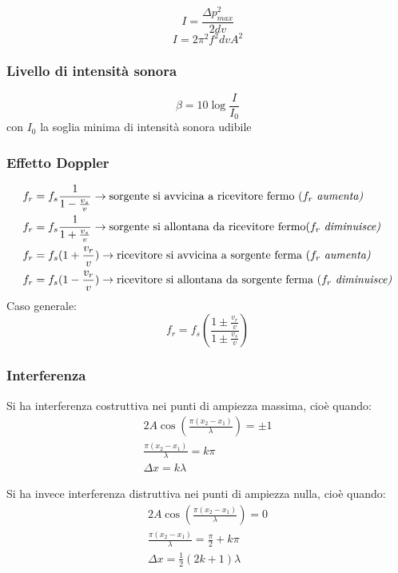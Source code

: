\documentclass{article}
\begin{document}
\vspace{1em}

$$ I = \frac{\Delta p_{max}^2}{2dv} $$
$$ I = 2\pi^2 f^2 dvA^2 $$

\subsubsection*{Livello di intensità sonora}
$$ \beta = 10 \log\frac{I}{I_0} $$
con $I_0$ la soglia minima di intensità sonora udibile

\subsubsection*{Effetto Doppler}
\begin{align*}
    f_r &= f_s \frac{1}{1 - \frac{v_s}{v}} \rightarrow \text{sorgente si avvicina a ricevitore fermo ($f_r$ \textit{aumenta)}} \\
    f_r &= f_s \frac{1}{1 + \frac{v_s}{v}} \rightarrow \text{sorgente si allontana da ricevitore fermo($f_r$ \textit{diminuisce)}} \\
    f_r &= f_s(1 + \frac{v_r}{v}) \rightarrow \text{ricevitore si avvicina a sorgente ferma ($f_r$ \textit{aumenta)}} \\
    f_r &= f_s(1 - \frac{v_r}{v}) \rightarrow \text{ricevitore si allontana da sorgente ferma ($f_r$ \textit{diminuisce)}}
\end{align*}
Caso generale:
$$ f_r = f_s\left(\frac{1 \pm \frac{v_r}{v}}{1 \pm \frac{v_s}{v}}\right) $$

\subsubsection*{Interferenza}
Si ha interferenza costruttiva nei punti di ampiezza massima, cioè quando:
\begin{align*}
    2A\cos{\left(\frac{\pi(x_2-x_1)}{\lambda}\right)} = \pm 1 \\
    \frac{\pi(x_2-x_1)}{\lambda} = k\pi \\
    \Delta x = k\lambda
\end{align*}

\vspace{1em}

Si ha invece interferenza distruttiva nei punti di ampiezza nulla, cioè quando:
\begin{align*}
    2A\cos{\left(\frac{\pi(x_2-x_1)}{\lambda}\right)} = 0 \\
    \frac{\pi(x_2-x_1)}{\lambda} = \frac{\pi}{2} + k\pi \\
    \Delta x = \frac{1}{2}(2k+1)\lambda
\end{align*}
\end{document}
